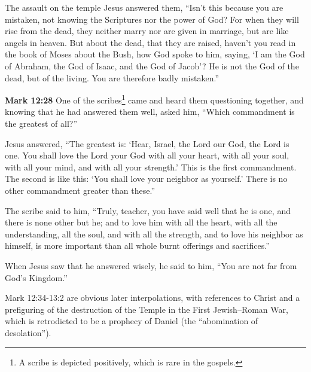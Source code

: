 \documentclass[10pt,twoside]{article} %
\newcommand{\quotesize}{\normalsize{}}
\newcommand{\comm}[1]{\begingroup \color{black!50} #1\endgroup}
\newenvironment{quotetext}{\begingroup\quotesize}{\endgroup}
\newcommand{\bible}[2]{\begin{quotetext}\textbf{#1} #2\end{quotetext}}
\newcommand{\gospelmark}[2]{\bible{Mark #1}{#2}}
\begin{document}
\begin{section}{The assault on the temple}
{  Jesus answered them, ``Isn't this because you are mistaken, not knowing the Scriptures nor the power of God?    For when they will rise from the dead, they neither marry nor are given in marriage, but are like angels in heaven.    But about the dead, that they are raised, haven't you read in the book of Moses about the Bush, how God spoke to him, saying, `I am the God of Abraham, the God of Isaac, and the God of Jacob'?    He is not the God of the dead, but of the living. You are therefore badly mistaken.'' 
}

\gospelmark{12:28}{
One of the scribes\footnote{A scribe is depicted positively, which is rare in the gospels.} came and heard them questioning together, and knowing that he had answered them well, asked him, ``Which commandment is the greatest of all?''

  Jesus answered, ``The greatest is: `Hear, Israel, the Lord our God, the Lord is one.    You shall love the Lord your God with all your heart, with all your soul, with all your mind, and with all your strength.' This is the first commandment.    The second is like this: `You shall love your neighbor as yourself.' There is no other commandment greater than these.''

  The scribe said to him, ``Truly, teacher, you have said well that he is one, and there is none other but he;   and to love him with all the heart, with all the understanding, all the soul, and with all the strength, and to love his neighbor as himself, is more important than all whole burnt offerings and sacrifices.''

  When Jesus saw that he answered wisely, he said to him, ``You are not far from God's Kingdom.'' 
}

\comm{Mark 12:34-13:2 are obvious later interpolations, with references to Christ and a prefiguring of the destruction of the
Temple in the First Jewish–Roman War, which is retrodicted to be a prophecy of Daniel (the ``abomination of desolation'').}

\end{section}
\end{document}
